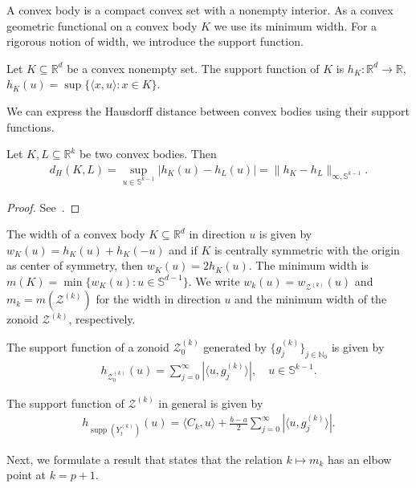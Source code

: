 A convex body is a compact convex set with a nonempty interior. As a convex geometric functional on a convex body $K$ we use its minimum width. For a rigorous notion of width, we introduce the support function.

\begin{Def}
    Let $K\subseteq\mathbb{R}^{d}$ be a convex nonempty set. The support function of $K$ is $h_K:\mathbb{R}^d\to\mathbb{R}$, $h_K(u)=\sup\{\langle x,u\rangle:x\in K\}$.
\end{Def}

We can express the Hausdorff distance between convex bodies using their support functions.

\begin{Lem}\label{lem:hausdorff_distance_between_convex_bodies}
    Let $K,L\subseteq\mathbb{R}^k$ be two convex bodies. Then
    \begin{align*}
        d_H(K,L)=\sup_{u\in\mathbb{S}^{k-1}}|h_{K}(u)-h_{L}(u)|=\|h_K-h_L\|_{\infty,\mathbb{S}^{k-1}}.
    \end{align*}
\end{Lem}

\begin{proof}
    See~\cite[Section 4]{GRUBER1993301}.
\end{proof}

The width of a convex body $K\subseteq\mathbb{R}^{d}$ in direction $u$ is given by $w_K(u)=h_K(u)+h_K(-u)$ and if $K$ is centrally symmetric with the origin as center of symmetry, then $w_K(u)=2h_K(u)$. The minimum width is $m(K)=\min\{w_K(u):u\in\mathbb{S}^{d-1}\}$. We write $w_k(u)=w_{\mathcal{Z}^{(k)}}(u)$ and $m_k=m(\mathcal{Z}^{(k)})$ for the width in direction $u$ and the minimum width of the zonoid $\mathcal{Z}^{(k)}$, respectively.

The support function of a zonoid $\mathcal{Z}^{(k)}_0$ generated by $\{g_j^{(k)}\}_{j\in\mathbb{N}_0}$ is given by
\begin{align*}
    h_{\mathcal{Z}^{(k)}_0}(u)=\sum_{j=0}^{\infty}|\langle u,g_j^{(k)}\rangle|,\quad u\in\mathbb{S}^{k-1}.
\end{align*}

The support function of $\mathcal{Z}^{(k)}$ in general is given by
\begin{align*}
    h_{\operatorname{supp}(Y_t^{(k)})}(u)=\langle C_k,u\rangle+\frac{b-a}{2}\sum_{j=0}^{\infty}|\langle u,g_j^{(k)}\rangle|.
\end{align*}

Next, we formulate a result that states that the relation $k\mapsto m_k$ has an elbow point at $k=p+1$.

